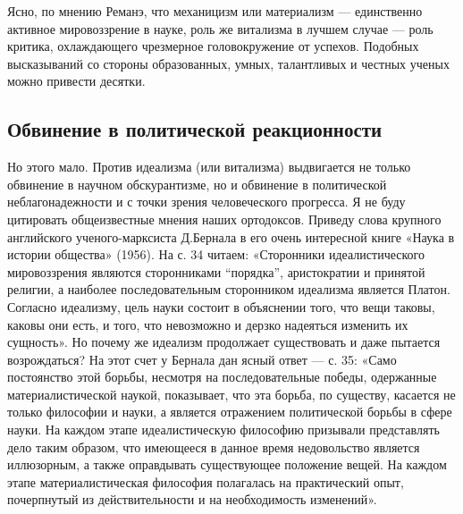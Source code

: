 Ясно, по мнению Реманэ, что механицизм или материализм --- единственно
активное мировоззрение в науке, роль  же витализма в лучшем случае ---
роль  критика,  охлаждающего  чрезмерное  головокружение  от  успехов.
Подобных высказываний  со стороны  образованных, умных,  талантливых и
честных ученых можно привести десятки. %

\subsection{Обвинение в политической реакционности}

Но  этого  мало.  Против  идеализма  (или  витализма)  выдвигается  не
только   обвинение  в   научном  обскурантизме,   но  и   обвинение  в
политической   неблагонадежности  и   с  точки   зрения  человеческого
прогресса. Я не буду цитировать общеизвестные мнения наших ортодоксов.
Приведу  слова  крупного  английского  ученого-марксиста  Д.Бернала  в
его  очень интересной  книге  «Наука в  истории  общества» (1956).  На
с.  34  читаем:  «Сторонники идеалистического  мировоззрения  являются
сторонниками ``порядка'', аристократии и  принятой религии, а наиболее
последовательным  сторонником  идеализма   является  Платон.  Согласно
идеализму,  цель науки  состоит в  объяснении того,  что вещи  таковы,
каковы они есть, и того, что невозможно и дерзко надеяться изменить их
сущность».  Но  почему  же  идеализм продолжает  существовать  и  даже
пытается возрождаться? На  этот счет у Бернала дан ясный  ответ --- с.
35:  «Само  постоянство  этой  борьбы,  несмотря  на  последовательные
победы,  одержанные  материалистической  наукой, показывает,  что  эта
борьба, по существу, касается не  только философии и науки, а является
отражением  политической  борьбы  в   сфере  науки.  На  каждом  этапе
идеалистическую философию  призывали представлять дело  таким образом,
что  имеющееся  в данное  время  недовольство  является иллюзорным,  а
также  оправдывать  существующее  положение  вещей.  На  каждом  этапе
материалистическая   философия   полагалась  на   практический   опыт,
почерпнутый из действительности и на необходимость изменений».

